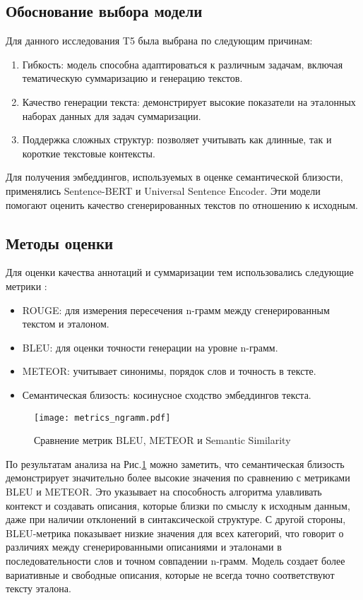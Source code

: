 \documentclass{article}
\begin{document}
\subsection{Обоснование выбора модели}

Для данного исследования T5 была выбрана по следующим причинам:
\begin{enumerate}
    \item Гибкость: модель способна адаптироваться к различным задачам, включая тематическую суммаризацию и генерацию текстов.
    \item Качество генерации текста: демонстрирует высокие показатели на эталонных наборах данных для задач суммаризации.
    \item Поддержка сложных структур: позволяет учитывать как длинные, так и короткие текстовые контексты.
\end{enumerate}

Для получения эмбеддингов, используемых в оценке семантической близости, применялись Sentence-BERT и Universal Sentence Encoder. Эти модели помогают оценить качество сгенерированных текстов по отношению к исходным.

\subsection{Методы оценки}

Для оценки качества аннотаций и суммаризации тем использовались следующие метрики \cite{papineni2002bleu}:
\begin{itemize}
    \item ROUGE: для измерения пересечения n-грамм между сгенерированным текстом и эталоном.
    \item BLEU: для оценки точности генерации на уровне n-грамм.
    \item METEOR: учитывает синонимы, порядок слов и точность в тексте.
    \item Семантическая близость: косинусное сходство эмбеддингов текста.
\end{itemize}


 \begin{figure}[!htb]
    \centering
    \texttt{[image: metrics\_ngramm.pdf]}
    \caption{Сравнение метрик BLEU, METEOR и Semantic Similarity}
    \label{fig:1}
\end{figure}

По результатам анализа на Рис.\ref{fig:1} можно заметить, что семантическая близость демонстрирует значительно более высокие значения по сравнению с метриками BLEU и METEOR. Это указывает на способность алгоритма улавливать контекст и создавать описания, которые близки по смыслу к исходным данным, даже при наличии отклонений в синтаксической структуре. С другой стороны, BLEU-метрика показывает низкие значения для всех категорий, что говорит о различиях между сгенерированными описаниями и эталонами в последовательности слов и точном совпадении n-грамм. Модель создает более вариативные и свободные описания, которые не всегда точно соответствуют тексту эталона.
\end{document}
